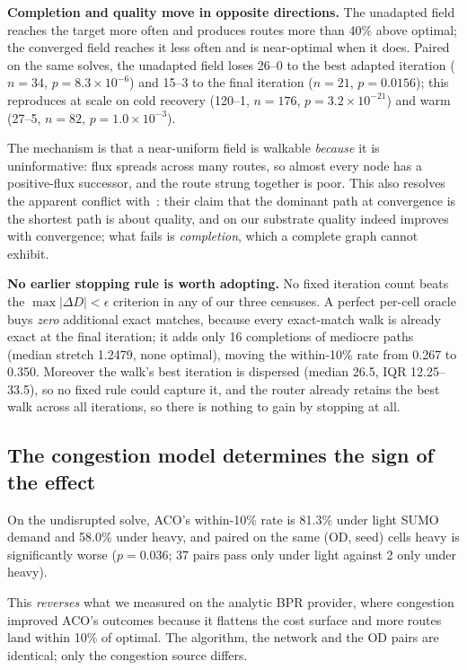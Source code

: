 \textbf{Completion and quality move in opposite directions.} The unadapted
field reaches the target more often and produces routes more than 40\% above
optimal; the converged field reaches it less often and is near-optimal when
it does. Paired on the same solves, the unadapted field loses 26--0 to the
best adapted iteration ($n=34$, $p=8.3\times10^{-6}$) and 15--3 to the final
iteration ($n=21$, $p=0.0156$); this reproduces at scale on cold recovery
(120--1, $n=176$, $p=3.2\times10^{-21}$) and warm (27--5, $n=82$,
$p=1.0\times10^{-3}$).

The mechanism is that a near-uniform field is walkable \emph{because} it is
uninformative: flux spreads across many routes, so almost every node has a
positive-flux successor, and the route strung together is poor. This also
resolves the apparent conflict with~\cite{wang2021transition}: their claim
that the dominant path at convergence is the shortest path is about quality,
and on our substrate quality indeed improves with convergence; what fails is \emph{completion}, which a complete graph cannot exhibit.

\textbf{No earlier stopping rule is worth adopting.} No fixed iteration count
beats the $\max|\Delta D| < \epsilon$ criterion in any of our three
censuses. A perfect per-cell oracle buys \emph{zero} additional exact
matches, because every exact-match walk is already exact at the final
iteration; it adds only 16 completions of mediocre paths (median stretch
1.2479, none optimal), moving the within-10\% rate from 0.267 to 0.350.
Moreover the walk's best iteration is dispersed (median 26.5, IQR
12.25--33.5), so no fixed rule could capture it, and the router already
retains the best walk across all iterations, so there is nothing to gain by
stopping at all.

\subsection{The congestion model determines the sign of the effect}

On the undisrupted solve, ACO's within-10\% rate is 81.3\% under light SUMO
demand and 58.0\% under heavy, and paired on the same (OD, seed) cells heavy
is significantly worse ($p=0.036$; 37 pairs pass only under light against 2
only under heavy).

This \emph{reverses} what we measured on the analytic BPR provider, where
congestion improved ACO's outcomes because it flattens the cost surface and
more routes land within 10\% of optimal. The algorithm, the network and the
OD pairs are identical; only the congestion source differs.

